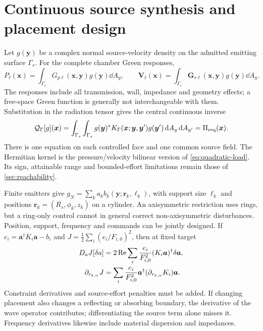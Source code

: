 \section{Continuous source synthesis and placement design}
\label{sec:placement}

Let $g(\bm y)$ be a complex normal source-velocity density on the admitted
emitting surface $\Gamma_s$. For the complete chamber Green responses,
\begin{equation}
 P_\ell(\bm x)=\int_{\Gamma_s}G_{p\ell}(\bm x,\bm y)g(\bm y)\dd A_y,
 \qquad
 \bm V_\ell(\bm x)=\int_{\Gamma_s}\bm G_{v\ell}(\bm x,\bm y)g(\bm y)\dd A_y.
 \label{eq:source-green-integrals}
\end{equation}
The responses include all transmission, wall, impedance and geometry effects;
a free-space Green function is generally not interchangeable with them.
Substitution in the radiation tensor gives the central continuous inverse
\begin{equation}
 \mathcal Q_\Gamma[g](\bm x)=
 \int_{\Gamma_s}\int_{\Gamma_s}g(\bm y)^*
 K_\Gamma(\bm x;\bm y,\bm y')g(\bm y')\,\mathrm d A_y\,\mathrm d A_{y'}
 =\Pi_{\rm req}(\bm x).
 \label{eq:continuous-load-integral}
\end{equation}
There is one equation on each controlled face and one common source field.
The Hermitian kernel is the pressure/velocity bilinear version of
\cref{eq:quadratic-load}. Its sign, attainable range and bounded-effort
limitations remain those of \cref{sec:reachability}.

Finite emitters give $g_N=\sum_k a_k b_k(\bm y;\bm r_k,\ell_k)$, with
support size $\ell_k$ and positions $\bm r_k=(R_s,\phi_k,z_k)$ on a cylinder.
An axisymmetric restriction uses rings, but a ring-only control cannot in
general correct non-axisymmetric disturbances. Position, support, frequency
and commands can be jointly designed. If $e_i=\bm a^\dagger K_i\bm a-b_i$
and $J=\tfrac12\sum_i(e_i/F_{i,0})^2$, then at fixed target
\begin{align}
 D_aJ[\delta a]&=2\operatorname{Re}\sum_i\frac{e_i}{F_{i,0}^2}
                        (K_i\bm a)^\dagger\delta\bm a,\\
 \partial_{r_{k,\alpha}}J&=\sum_i\frac{e_i}{F_{i,0}^2}
              \bm a^\dagger(\partial_{r_{k,\alpha}}K_i)\bm a.
 \label{eq:position-gradient}
\end{align}
Constraint derivatives and source-effort penalties must be added. If changing
placement also changes a reflecting or absorbing boundary, the derivative of
the wave operator contributes; differentiating the source term alone misses it.
Frequency derivatives likewise include material dispersion and impedances.


